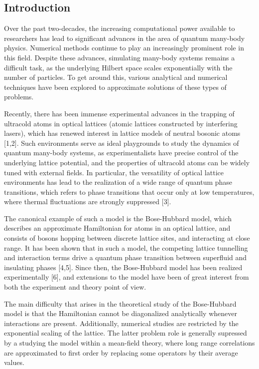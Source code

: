 \documentclass[11pt]{article}
\begin{document}
    \hypertarget{introduction}{%
\subsection{Introduction}\label{introduction}}

    Over the past two-decades, the increasing computational power available
to researchers has lead to significant advances in the area of quantum
many-body physics. Numerical methods continue to play an increasingly
prominent role in this field. Despite these advances, simulating
many-body systems remains a difficult task, as the underlying Hilbert
space scales exponentially with the number of particles. To get around
this, various analytical and numerical techniques have been explored to
approximate solutions of these types of problems.

Recently, there has been immense experimental advances in the trapping
of ultracold atoms in optical lattices (atomic lattices constructed by
interfering lasers), which has renewed interest in lattice models of
neutral bosonic atoms {[}1,2{]}. Such environments serve as ideal
playgrounds to study the dynamics of quantum many-body systems, as
experimentalists have precise control of the underlying lattice
potential, and the properties of ultracold atoms can be widely tuned
with external fields. In particular, the versatility of optical lattice
environments has lead to the realization of a wide range of quantum
phase transitions, which refers to phase transitions that occur only at
low temperatures, where thermal fluctuations are strongly suppressed
{[}3{]}.

The canonical example of such a model is the Bose-Hubbard model, which
describes an approximate Hamiltonian for atoms in an optical lattice,
and consists of bosons hopping between discrete lattice sites, and
interacting at close range. It has been shown that in such a model, the
competing lattice tunnelling and interaction terms drive a quantum phase
transition between superfluid and insulating phases {[}4,5{]}. Since
then, the Bose-Hubbard model has been realized experimentally {[}6{]},
and extensions to the model have been of great interest from both the
experiment and theory point of view.

The main difficulty that arises in the theoretical study of the
Bose-Hubbard model is that the Hamiltonian cannot be diagonalized
analytically whenever interactions are present. Additionally, numerical
studies are restricted by the exponential scaling of the lattice. The
latter problem role is generally supressed by a studying the model
within a mean-field theory, where long range correlations are
approximated to first order by replacing some operators by their average
values.
\end{document}
